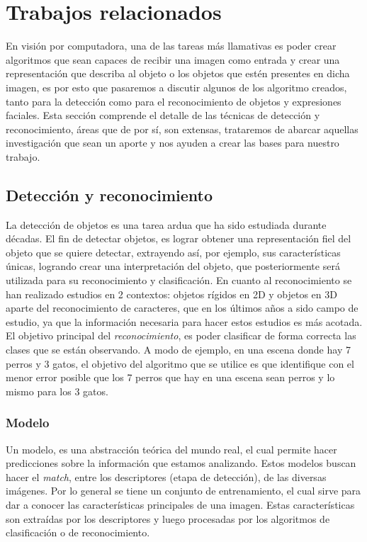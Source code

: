 \chapter[Trabajos relacionados ]{Trabajos relacionados }\label{ch:capitulo2}

En visión por computadora, una de las tareas más llamativas es poder crear algoritmos que sean capaces de recibir una imagen como entrada y crear una representación que describa al objeto o los objetos que estén presentes en dicha imagen, es por esto que pasaremos a discutir algunos de los algoritmo creados, tanto para la detección como para el reconocimiento de objetos y expresiones faciales. Esta sección comprende el detalle de las técnicas de detección y reconocimiento, áreas que de por sí, son extensas, trataremos de abarcar aquellas investigación que sean un aporte y nos ayuden a crear las bases para nuestro trabajo.

\section{Detección y reconocimiento}
La detección de objetos es una tarea ardua que ha sido estudiada durante décadas. El fin de detectar objetos, es lograr obtener una representación fiel del objeto que se quiere detectar, extrayendo así, por ejemplo, sus características únicas, logrando crear una interpretación del objeto, que posteriormente será utilizada para su reconocimiento y clasificación.
En cuanto al reconocimiento se han realizado estudios en 2 contextos: objetos rígidos en 2D y objetos en 3D aparte del reconocimiento de caracteres, que en los últimos años a sido campo de estudio, ya que la información necesaria para hacer estos estudios es más acotada. El objetivo principal del \textit{reconocimiento}, es poder clasificar de forma correcta las clases que se están observando. A modo de ejemplo, en una escena donde hay 7 perros y 3 gatos, el objetivo del algoritmo que se utilice es que identifique con el menor error posible que los 7 perros que hay en una escena sean perros y lo mismo para los 3 gatos.
\subsection{Modelo}
Un modelo, es una abstracción teórica del mundo real, el cual permite hacer predicciones sobre la información que estamos analizando. Estos modelos buscan hacer el \textit{match}, entre los descriptores (etapa de detección), de las diversas imágenes. Por lo general se tiene un conjunto de entrenamiento, el cual sirve para dar a conocer las características principales de una imagen. Estas características son extraídas por los descriptores y luego procesadas por los algoritmos de clasificación o de reconocimiento.

